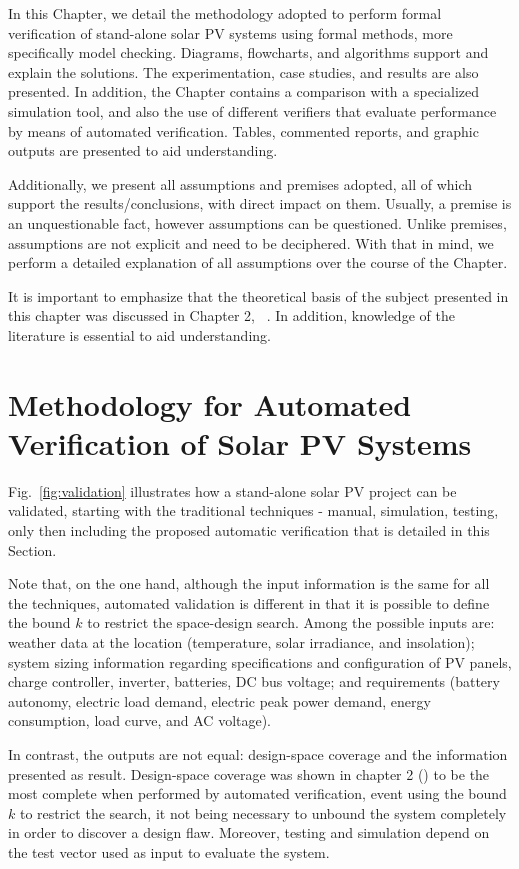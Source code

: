 In this Chapter, we detail the methodology adopted to perform formal verification of stand-alone solar PV systems using formal methods, more specifically model checking. Diagrams, flowcharts, and algorithms support and explain the solutions. The experimentation, case studies, and results are also presented. In addition, the Chapter contains a comparison with a specialized simulation tool, and also the use of different verifiers that evaluate performance by means of automated verification. Tables, commented reports, and graphic outputs are presented to aid  understanding.

Additionally, we present all assumptions and premises adopted, all of which support the results/conclusions, with direct impact on them. Usually, a premise is an unquestionable fact, however assumptions can be questioned. Unlike premises, assumptions are not explicit and need to be deciphered. With that in mind, we perform a detailed explanation of all assumptions over the course of the Chapter.

It is important to emphasize that the theoretical basis of the subject presented in this chapter was discussed in Chapter 2, ~. In addition, knowledge of the literature is essential to aid understanding.


\section{Methodology for Automated Verification of Solar PV Systems}

Fig.~\ref{fig:validation} illustrates how a stand-alone solar PV project can be validated, starting with the traditional techniques - manual, simulation, testing, only then including the proposed automatic verification that is detailed in this Section. 

Note that, on the one hand, although the input information is the same for all the techniques, automated validation is different in that it is possible to define the bound $k$ to restrict the space-design search. Among the possible inputs are: weather data at the location (temperature, solar irradiance, and insolation); system sizing information regarding specifications and configuration of PV panels, charge controller, inverter, batteries, DC bus  voltage; and requirements (battery autonomy, electric load demand, electric peak power demand, energy consumption, load curve, and AC voltage).

In contrast, the outputs are not equal: design-space coverage and the information presented as result. Design-space coverage was shown in chapter 2 () to be the most complete when performed by automated verification, event using the bound $k$ to restrict the search, it not being necessary to unbound the system completely in order to discover a design flaw. Moreover, testing and simulation depend on the test vector used as input to evaluate the system.

